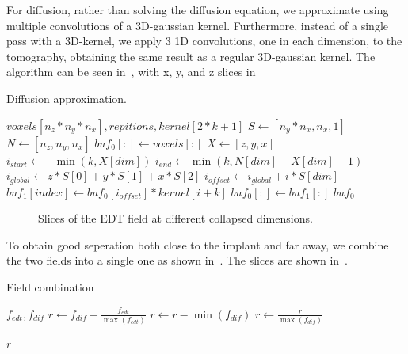 For diffusion, rather than solving the diffusion equation, we approximate using multiple convolutions of a 3D-gaussian kernel.
Furthermore, instead of a single pass with a 3D-kernel, we apply 3 1D convolutions, one in each dimension, to the tomography, obtaining the same result as a regular 3D-gaussian kernel.
The algorithm can be seen in~, with x, y, and z slices in~

\begin{algorithm}
    \caption{Diffusion approximation.}
    \label{alg:diffusion}
    \begin{algorithmic}
         {$voxels[n_z*n_y*n_x], repitions, kernel[2*k+1]$}
            \State $S \gets [n_y * n_x, n_x, 1]$
            \State $N \gets [n_z, n_y, n_x]$
            \State $buf_0[:] \gets voxels[:]$
                        \State $X \gets [z,y,x]$
                        \State $i_{start} \gets - \min (k, X[dim])$
                        \State $i_{end} \gets \min (k, N[dim] - X[dim] - 1)$
                        \State $i_{global} \gets z*S[0] + y*S[1] + x*S[2]$
                            \State $i_{offset} \gets i_{global} + i*S[dim]$
                            \State $buf_1[index] \gets buf_0[i_{offset}] * kernel[i+k]$
                        \EndFor
                    \EndFor
                    \State $buf_0[:] \gets buf_1[:]$
                \EndFor
            \EndFor
            \Return $buf_0$
        \EndFunction
    \end{algorithmic}
\end{algorithm}

\begin{figure}
    \caption{Slices of the EDT field at different collapsed dimensions.}
    \label{fig:field-slices}
\end{figure}

To obtain good seperation both close to the implant and far away, we combine the two fields into a single one as shown in~. The slices are shown in~.

\begin{algorithm}
    \caption{Field combination}
    \label{alg:field-comb}
    \begin{algorithmic}
         {$f_{edt}, f_{dif}$}
            \State $r \gets f_{dif} - \frac{f_{edt}}{\max (f_{edt})}$
            \State $r \gets r - \min (f_{dif})$
            \State $r \gets \frac{r}{\max (f_{dif})}$

            \Return $r$
        \EndFunction
    \end{algorithmic}
\end{algorithm}

